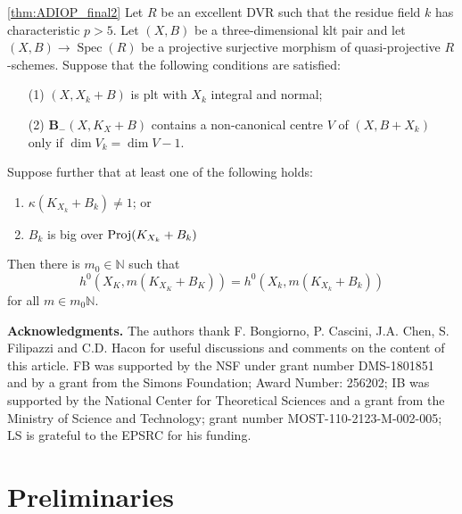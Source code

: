 \documentclass[a4paper,12pt]{book}
\DeclareMathOperator{\Spec}{Spec}
\begin{document}
	\begin{theorem}\label{Main_Abund2}\autoref{thm:ADIOP_final2}
		Let $R$ be an excellent DVR such that the residue field $k$ has characteristic $p>5$.
		Let $(X,B)$ be a three-dimensional klt pair and let $(X,B)\to \Spec(R)$ be a projective surjective morphism of quasi-projective $R$-schemes.  Suppose that the following conditions are satisfied:
		
		\begin{enumerate}
		\item[(1)] $(X,X_{k}+B)$ is plt with $X_k$ integral and normal;
		\item[(2)] ${\mathbf{B}_{-}(X, K_{X}+B)}$ contains a non-canonical centre $V$ of $(X,B+X_{k})$ only if $\dim V_{k}=\dim V -1$.
		\end{enumerate}
		
		Suppose further that at least one of the following holds:
		\begin{enumerate}
			\item $\kappa(K_{X_{k}}+B_{k}) \neq 1$; or
			\item $B_{k}$ is big over $\textup{Proj}(K_{X_{k}}+B_{k})$
		\end{enumerate}	
		Then there is $m_{0} \in \mathbb{N}$ such that 
		$$h^{0}(X_{K},m(K_{X_{K}}+B_{K}))=h^{0}(X_{k},m(K_{X_{k}}+B_{k}))$$
		for all $m \in m_{0}\mathbb{N}$.
		
	\end{theorem}
	
	\textbf{Acknowledgments.}
	The authors thank F. Bongiorno, P. Cascini, J.A. Chen, S. Filipazzi and C.D. Hacon for useful discussions and comments on the content of this article. 
	FB was supported by the NSF under grant number DMS-1801851 and by a grant from the Simons Foundation; Award Number: 256202; IB was supported by the National Center for Theoretical Sciences and a grant from the Ministry of Science and Technology; grant number MOST-110-2123-M-002-005; LS is grateful to the EPSRC for his funding.
	
	\section{Preliminaries}
	
\end{document}
